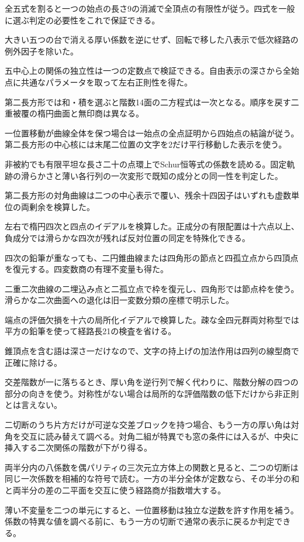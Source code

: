 \documentclass[11pt,a4paper]{ltjsarticle}
\begin{document}
全五式を割ると一つの始点の長さ9の消滅で全頂点の有限性が従う。四式を一般に選ぶ判定の必要性をこれで保証できる。

大きい五つの台で消える厚い係数を逆にせず、回転で移した八表示で低次経路の例外因子を除いた。

五中心上の関係の独立性は一つの定数点で検証できる。自由表示の深さから全始点に共通なパラメータを取って左右正則性を得た。

第二長方形では和・積を選ぶと階数14面の二方程式は一次となる。順序を戻す二重被覆の楕円曲面と無印商は異なる。

一位置移動が曲線全体を保つ場合は一始点の全点証明から四始点の結論が従う。第二長方形の中心核には末尾二位置の文字を2だけ平行移動した表示を使う。

非被約でも有限平坦な長さ二十の点環上でSchur恒等式の係数を読める。固定軌跡の滑らかさと薄い各行列の一次変形で既知の成分との同一性を判定した。

第二長方形の対角曲線は二つの中心表示で覆い、残余十四因子はいずれも虚数単位の両剰余を検算した。

左右で楕円四次と四点のイデアルを検算した。正成分の有限配置は十六点以上、負成分では滑らかな四次が残れば反対位置の同定を特殊化できる。

四次の鉛筆が重なっても、二円錐曲線または四角形の節点と四孤立点から四頂点を復元する。四変数商の有理不変量も得た。

二重二次曲線の二埋込み点と二孤立点で枠を復元し、四角形では節点枠を使う。滑らかな二次曲面への退化は旧一変数分類の座標で明示した。

端点の評価欠損を十六の局所化イデアルで検算した。疎な全四元群両対称型では平方の鉛筆を使って経路長21の検査を省ける。

錐頂点を含む語は深さ一だけなので、文字の持上げの加法作用は四列の線型商で正確に除ける。

交差階数が一に落ちるとき、厚い角を逆行列で解く代わりに、階数分解の四つの部分の向きを使う。対称性がない場合は局所的な評価階数の低下だけから非正則とは言えない。

二切断のうち片方だけが可逆な交差ブロックを持つ場合、もう一方の厚い角は対角を交互に読み替えて調べる。対角二組が特異でも窓の条件には入るが、中央に挿入する二次関係の階数が下がり得る。

両半分内の八係数を偶パリティの三次元立方体上の関数と見ると、二つの切断は同じ一次係数を相補的な符号で読む。一方の半分全体が定数なら、その半分の和と両半分の差の二平面を交互に使う経路商が指数増大する。

薄い不変量を二つの単元にすると、一位置移動は独立な逆数を許す作用を補う。係数の特異な値を調べる前に、もう一方の切断で通常の表示に戻るか判定できる。
\end{document}
